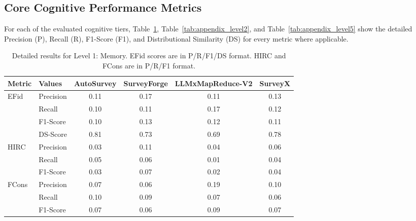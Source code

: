 \documentclass[11pt]{article}
\begin{document}
\subsection{Core Cognitive Performance Metrics}
For each of the evaluated cognitive tiers, Table~\ref{tab:appendix_level1}, Table~\ref{tab:appendix_level2}, and Table~\ref{tab:appendix_level5} show the detailed Precision (P), Recall (R), F1-Score (F1), and Distributional Similarity (DS) for every metric where applicable.
\begin{table}[h!]
    \centering
    \caption{Detailed results for Level 1: Memory. EFid scores are in P/R/F1/DS format. HIRC and FCons are in P/R/F1 format.}
    \label{tab:appendix_level1}
    \begin{tabular}{llcccc}
        \toprule
        \textbf{Metric} & \textbf{Values} & \textbf{AutoSurvey} & \textbf{SurveyForge} & \textbf{LLMxMapReduce-V2} & \textbf{SurveyX} \\
        \midrule
        \multirow{4}{*}{EFid} 
            & Precision & 0.11 & 0.17 & 0.11 & 0.13 \\
            & Recall    & 0.10 & 0.11 & 0.17 & 0.12 \\
            & F1-Score  & 0.10 & 0.13 & 0.12 & 0.11 \\
            & DS-Score  & 0.81 & 0.73 & 0.69 & 0.78 \\
        \midrule
        \multirow{3}{*}{HIRC} 
            & Precision & 0.03 & 0.11 & 0.04 & 0.06 \\
            & Recall    & 0.05 & 0.06 & 0.01 & 0.04 \\
            & F1-Score  & 0.03 & 0.07 & 0.02 & 0.04 \\
        \midrule
        \multirow{3}{*}{FCons} 
            & Precision & 0.07 & 0.06 & 0.19 & 0.10 \\
            & Recall    & 0.10 & 0.09 & 0.07 & 0.06 \\
            & F1-Score  & 0.07 & 0.06 & 0.09 & 0.07 \\
        \bottomrule
    \end{tabular}
\end{table}
\end{document}
